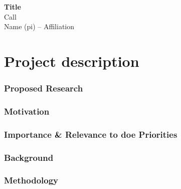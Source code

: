 \documentclass[11pt,letterpaper]{article}
\newcommand{\acs}{\acrshort} %
\begin{document}


{\centering 
    \textbf{Title\\
    }
    Call\\
    Name (\acs{pi}) -- Affiliation\\
\par
}


\noindent\makebox[\linewidth]{\rule{\textwidth}{0.5pt}} %



\part*{Project description}
\section{Proposed Research} 




\section{Motivation}


\section{Importance \& Relevance to \acs{doe} Priorities}


\section{Background}


\section{Methodology}

\end{document}

